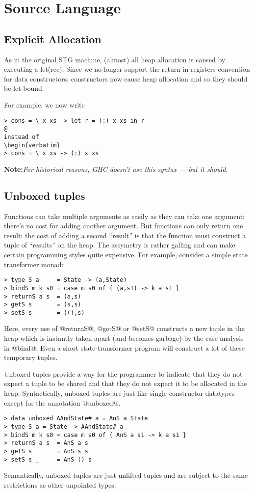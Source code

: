 \documentclass[11pt]{article}
\newcommand{\note}[1]{{{\bf Note:}\sl #1}}
\newcommand{\Section}[2]{\section{#1}\label{sec:#2}}
\newcommand{\Subsection}[2]{\subsection{#1}\label{sec:#2}}
\begin{document}
\Section{Source Language}{source-language}

\Subsection{Explicit Allocation}{explicit-allocation}

As in the original STG machine, (almost) all heap allocation is caused
by executing a let(rec).  Since we no longer support the return in
registers convention for data constructors, constructors now cause heap
allocation and so they should be let-bound.

For example, we now write
\begin{verbatim}
> cons = \ x xs -> let r = (:) x xs in r
@
instead of
\begin{verbatim}
> cons = \ x xs -> (:) x xs
\end{verbatim}

\note{For historical reasons, GHC doesn't use this syntax --- but it should.}

\Subsection{Unboxed tuples}{unboxed-tuples}

Functions can take multiple arguments as easily as they can take one
argument: there's no cost for adding another argument.  But functions
can only return one result: the cost of adding a second ``result'' is
that the function must construct a tuple of ``results'' on the heap.
The assymetry is rather galling and can make certain programming
styles quite expensive.  For example, consider a simple state transformer
monad:
\begin{verbatim}
> type S a     = State -> (a,State)
> bindS m k s0 = case m s0 of { (a,s1) -> k a s1 }
> returnS a s  = (a,s)
> getS s       = (s,s)
> setS s _     = ((),s)
\end{verbatim}
Here, every use of @returnS@, @getS@ or @setS@ constructs a new tuple
in the heap which is instantly taken apart (and becomes garbage) by
the case analysis in @bind@.  Even a short state-transformer program
will construct a lot of these temporary tuples.

Unboxed tuples provide a way for the programmer to indicate that they
do not expect a tuple to be shared and that they do not expect it to
be allocated in the heap.  Syntactically, unboxed tuples are just like
single constructor datatypes except for the annotation @unboxed@.
\begin{verbatim}
> data unboxed AAndState# a = AnS a State
> type S a = State -> AAndState# a
> bindS m k s0 = case m s0 of { AnS a s1 -> k a s1 }
> returnS a s  = AnS a s
> getS s       = AnS s s
> setS s _     = AnS () s
\end{verbatim}
Semantically, unboxed tuples are just unlifted tuples and are subject
to the same restrictions as other unpointed types.
\end{document}
